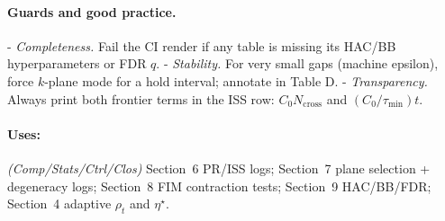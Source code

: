 \paragraph{Guards and good practice.}
- \emph{Completeness.} Fail the CI render if any table is missing its HAC/BB hyperparameters or FDR $q$.  
- \emph{Stability.} For very small gaps (machine epsilon), force $k$-plane mode for a hold interval; annotate in Table D.  
- \emph{Transparency.} Always print both frontier terms in the ISS row: $C_0 N_{\mathrm{cross}}$ and $(C_0/\tau_{\min})t$.

\paragraph{Uses:} \textit{(Comp/Stats/Ctrl/Clos)} Section~6 PR/ISS logs; Section~7 plane selection + degeneracy logs; Section~8 FIM contraction tests; Section~9 HAC/BB/FDR; Section~4 adaptive $\rho_t$ and $\eta^\star$.


